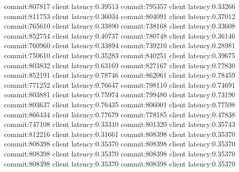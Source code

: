 commit:807817 client latency:0.39513
commit:795357 client latency:0.33266
commit:811753 client latency:0.36034
commit:804091 client latency:0.37012
commit:765610 client latency:0.33890
commit:738168 client latency:0.33608
commit:852754 client latency:0.40737
commit:780748 client latency:0.36146
commit:760960 client latency:0.33894
commit:739210 client latency:0.28981
commit:750610 client latency:0.35283
commit:840251 client latency:0.39675
commit:803832 client latency:0.63169
commit:827167 client latency:0.77830
commit:852191 client latency:0.78746
commit:862061 client latency:0.78459
commit:771252 client latency:0.76647
commit:798110 client latency:0.74691
commit:803881 client latency:0.75974
commit:799480 client latency:0.73190
commit:803637 client latency:0.76435
commit:806001 client latency:0.77598
commit:866434 client latency:0.77679
commit:778185 client latency:0.47838
commit:747108 client latency:0.33310
commit:801320 client latency:0.35743
commit:812216 client latency:0.31661
commit:808398 client latency:0.35370
commit:808398 client latency:0.35370
commit:808398 client latency:0.35370
commit:808398 client latency:0.35370
commit:808398 client latency:0.35370
commit:808398 client latency:0.35370
commit:808398 client latency:0.35370
